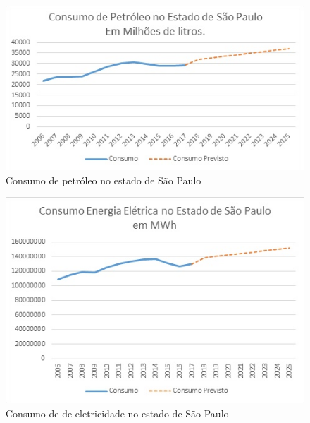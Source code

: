 \begin{figure}[htb]
	\begin{center}
	    \includegraphics[scale=1.0]{consumo_petroleo_sp.jpg}
	\end{center}
	\vspace*{-0.5cm}
	\caption{\label{fig_grafico}Consumo de petróleo no estado de São Paulo}
\end{figure}

\begin{figure}[htb]
	\begin{center}
	    \includegraphics[scale=1.0]{consumo_eletricidade_sp.jpg}
	\end{center}
	\vspace*{-0.5cm}
	\caption{\label{fig_grafico}Consumo de de eletricidade no estado de São Paulo}
\end{figure}

